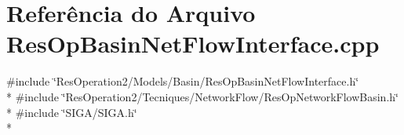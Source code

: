 \section{Referência do Arquivo Res\+Op\+Basin\+Net\+Flow\+Interface.\+cpp}
\label{_res_op_basin_net_flow_interface_8cpp}
{\ttfamily \#include \char`\"{}Res\+Operation2/\+Models/\+Basin/\+Res\+Op\+Basin\+Net\+Flow\+Interface.\+h\char`\"{}}\\*
{\ttfamily \#include \char`\"{}Res\+Operation2/\+Tecniques/\+Network\+Flow/\+Res\+Op\+Network\+Flow\+Basin.\+h\char`\"{}}\\*
{\ttfamily \#include \char`\"{}S\+I\+G\+A/\+S\+I\+G\+A.\+h\char`\"{}}\\*
